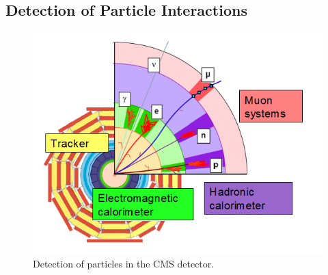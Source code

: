 \subsection{Detection of Particle Interactions}
\label{exp:particleDetection}

 \begin{figure}[htb]
  \begin{center}
    \includegraphics[width=360pt]{Figures/CMSParticles.png}
  \end{center}
  \caption[\fixspacing Detection of particles in the CMS detector]
	  {\fixspacing Detection of particles in the CMS detector.}
  \label{fig:CMSParticles}
 \end{figure}


